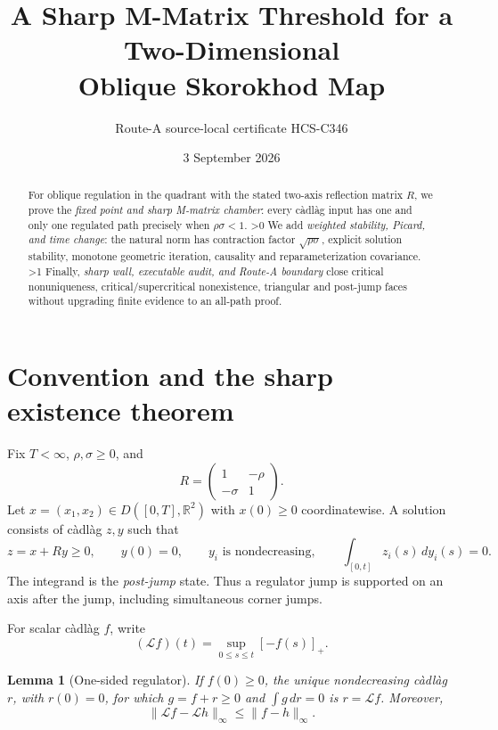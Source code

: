 \documentclass[10pt]{article}
\title{A Sharp M-Matrix Threshold for a Two-Dimensional\\Oblique Skorokhod Map}
\author{Route-A source-local certificate HCS-C346}
\date{3 September 2026}
\providecommand{\CRevisionRound}{2}
\newtheorem{lemma}[theorem]{Lemma}
\newcommand{\RR}{\mathbb R}
\newcommand{\norm}[1]{\lVert#1\rVert}
\newcommand{\calL}{\mathcal L}
\begin{document}
\maketitle
\begin{abstract}
For oblique regulation in the quadrant with the stated two-axis reflection
matrix $R$,
we prove the \emph{fixed point and sharp M-matrix chamber}:
every c\`adl\`ag input has one and only one regulated path precisely when
$\rho\sigma<1$.
\ifnum\CRevisionRound>0
We add \emph{weighted stability, Picard, and time change}: the natural norm
has contraction factor $\sqrt{\rho\sigma}$, explicit solution stability,
monotone geometric iteration, causality and reparameterization covariance.
\fi
\ifnum\CRevisionRound>1
Finally, \emph{sharp wall, executable audit, and Route-A boundary} close
critical nonuniqueness, critical/supercritical nonexistence, triangular and
post-jump faces without upgrading finite evidence to an all-path proof.
\fi
\end{abstract}

\section{Convention and the sharp existence theorem}
Fix $T<\infty$, $\rho,\sigma\geq0$, and
\[
 R=\begin{pmatrix}1&-\rho\\-\sigma&1\end{pmatrix}.
\]
Let $x=(x_1,x_2)\in D([0,T],\RR^2)$ with $x(0)\geq0$ coordinatewise.
A solution consists of c\`adl\`ag $z,y$ such that
\begin{equation}\label{eq:sp}
 z=x+Ry\geq0,\qquad y(0)=0,\qquad y_i\text{ is nondecreasing},
 \qquad \int_{[0,t]}z_i(s)\,dy_i(s)=0.
\end{equation}
The integrand is the \emph{post-jump} state.  Thus a regulator jump is
supported on an axis after the jump, including simultaneous corner jumps.

For scalar c\`adl\`ag $f$, write
\[
 (\calL f)(t)=\sup_{0\leq s\leq t}[-f(s)]_+.
\]

\begin{lemma}[One-sided regulator]\label{lem:scalar}
If $f(0)\geq0$, the unique nondecreasing c\`adl\`ag $r$, with $r(0)=0$,
for which $g=f+r\geq0$ and $\int g\,dr=0$ is $r=\calL f$.  Moreover,
\begin{equation}\label{eq:Llip}
 \norm{\calL f-\calL h}_\infty\leq\norm{f-h}_\infty.
\end{equation}
\end{lemma}
\end{document}
